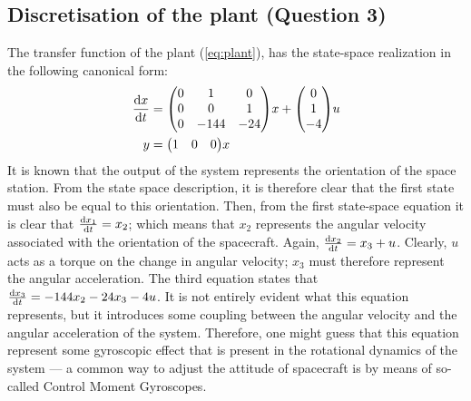 \subsection{Discretisation of the plant \textnormal{\phantom{xxx}(Question 3)}}
The transfer function of the plant (\cref{eq:plant}), has the state-space realization in the following canonical form:
\begin{equation}
    \begin{aligned}
        \dv{x}{t} &= \mqty(0 & 1 & 0 \\ 0 & 0 & 1 \\ 0 & -144 & -24)x + \mqty(0 \\ 1 \\ -4)u\\
        y &= \mqty(1 & 0 & 0)x
    \end{aligned}
\end{equation}
It is known that the output of the system represents the orientation of the space station. From the state space description, it is therefore clear that the first state must also be equal to this orientation. Then, from the first state-space equation it is clear that $\dv{x_1}{t} = x_2$; which means that $x_2$ represents the angular velocity associated with the orientation of the spacecraft. Again, $\dv{x_2}{t} = x_3 + u$. Clearly, $u$ acts as a torque on the change in angular velocity; $x_3$ must therefore represent the angular acceleration. The third equation states that $\dv{x_3}{t} = -144x_2 - 24x_3 -4u$. It is not entirely evident what this equation represents, but it introduces some coupling between the angular velocity and the angular acceleration of the system. Therefore, one might guess that this equation represent some gyroscopic effect that is present in the rotational dynamics of the system --- a common way to adjust the attitude of spacecraft is by means of so-called Control Moment Gyroscopes.

